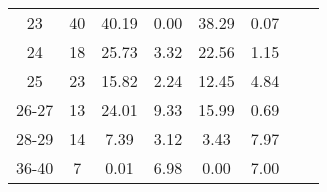 \begin{center}
\begin{table}[H]
\begin{tabular}{cccccccc}
23 & \num{   40} & \num{40.19} & \num{0.00} & \num{38.29} & \num{0.07} \\
24 & \num{   18} & \num{25.73} & \num{3.32} & \num{22.56} & \num{1.15} \\
25 & \num{   23} & \num{15.82} & \num{2.24} & \num{12.45} & \num{4.84} \\
26-27 & \num{   13} & \num{24.01} & \num{9.33} & \num{15.99} & \num{0.69} \\
28-29 & \num{   14} & \num{7.39} & \num{3.12} & \num{3.43} & \num{7.97} \\
36-40 & \num{    7} & \num{0.01} & \num{6.98} & \num{0.00} & \num{7.00} \\
\bottomrule
\end{tabular}
\end{table}
\end{center}
